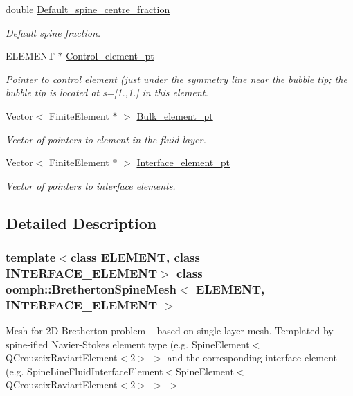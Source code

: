 \begin{DoxyCompactItemize}
double \hyperlink{classoomph_1_1BrethertonSpineMesh_a306cf8ae8f91a81054904de64195bb16}{Default\+\_\+spine\+\_\+centre\+\_\+fraction}
\begin{DoxyCompactList}\small\item\em Default spine fraction. \end{DoxyCompactList}\item 
E\+L\+E\+M\+E\+NT $\ast$ \hyperlink{classoomph_1_1BrethertonSpineMesh_a81ee86c0c747947dab52073c221d53c1}{Control\+\_\+element\+\_\+pt}
\begin{DoxyCompactList}\small\item\em Pointer to control element (just under the symmetry line near the bubble tip; the bubble tip is located at s=\mbox{[}1.,1.\mbox{]} in this element. \end{DoxyCompactList}\item 
Vector$<$ Finite\+Element $\ast$ $>$ \hyperlink{classoomph_1_1BrethertonSpineMesh_aeb4fa323886ed601b1497777f8e686bc}{Bulk\+\_\+element\+\_\+pt}
\begin{DoxyCompactList}\small\item\em Vector of pointers to element in the fluid layer. \end{DoxyCompactList}\item 
Vector$<$ Finite\+Element $\ast$ $>$ \hyperlink{classoomph_1_1BrethertonSpineMesh_a204c551bf8ac1a3a4ca4cd31c0db9c56}{Interface\+\_\+element\+\_\+pt}
\begin{DoxyCompactList}\small\item\em Vector of pointers to interface elements. \end{DoxyCompactList}\end{DoxyCompactItemize}


\subsection{Detailed Description}
\subsubsection*{template$<$class E\+L\+E\+M\+E\+NT, class I\+N\+T\+E\+R\+F\+A\+C\+E\+\_\+\+E\+L\+E\+M\+E\+NT$>$\newline
class oomph\+::\+Bretherton\+Spine\+Mesh$<$ E\+L\+E\+M\+E\+N\+T, I\+N\+T\+E\+R\+F\+A\+C\+E\+\_\+\+E\+L\+E\+M\+E\+N\+T $>$}

Mesh for 2D Bretherton problem -- based on single layer mesh. Templated by spine-\/ified Navier-\/\+Stokes element type (e.\+g. Spine\+Element$<$Q\+Crouzeix\+Raviart\+Element$<$2$>$ $>$ and the corresponding interface element (e.\+g. Spine\+Line\+Fluid\+Interface\+Element$<$Spine\+Element$<$Q\+Crouzeix\+Raviart\+Element$<$2$>$ $>$ $>$ 

